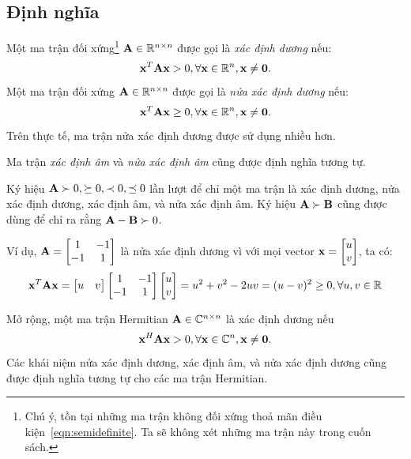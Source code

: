 \subsection{Định nghĩa} %
\label{sub:dinh_nghia}
Một ma trận đối xứng\footnote{Chú ý, tồn tại những ma trận không đối xứng thoả
mãn điều kiện~\eqref{eqn:semidefinite}. Ta sẽ không xét những ma trận này trong cuốn sách.}
$\mathbf{A} \in \mathbb{R}^{n\times n}$ được gọi là \textit{xác định dương} nếu:
\begin{equation}
\label{eqn:semidefinite}
\mathbf{x}^T\mathbf{A}\mathbf{x} > 0, \forall \mathbf{x} \in \mathbb{R}^{n}, \mathbf{x} \neq \mathbf{0}.
\end{equation}
Một ma trận đối xứng $\mathbf{A} \in \mathbb{R}^{n \times n}$ được gọi là \textit{nửa xác định
dương} nếu:
\begin{equation}
\mathbf{x}^T\mathbf{A}\mathbf{x} \geq 0, \forall \mathbf{x} \in \mathbb{R}^{n}, \mathbf{x} \neq \mathbf{0}.
\end{equation}
Trên thực tế, ma trận nửa xác định dương được sử dụng nhiều hơn.


Ma trận \textit{xác định âm} và \textit{nửa xác định âm}  cũng được định nghĩa
tương tự.

Ký hiệu $\mathbf{A} \succ 0, \succeq 0, \prec 0, \preceq 0$ lần lượt để chỉ một ma trận
là xác định dương, nửa xác định dương, xác định âm, và nửa xác định âm. Ký hiệu
$\mathbf{A} \succ \mathbf{B}$ cũng được dùng để chỉ ra rằng $\mathbf{A} - \mathbf{B}
\succ 0$.

Ví dụ, $\mathbf{A} = \left[\begin{matrix} 1 & -1 \\ -1 & 1\end{matrix}\right]$ là nửa xác định dương vì với mọi vector
$\mathbf{x} = \left[\begin{matrix} u \\ v \end{matrix}\right]$, ta có:
\begin{equation}
\mathbf{x}^T \mathbf{A}\mathbf{x} = \left[\begin{matrix} u & v \end{matrix}\right] \left[\begin{matrix} 1 & -1 \\ -1 & 1\end{matrix}\right] \left[\begin{matrix} u \\ v \end{matrix}\right] =
u^2 + v^2 - 2uv = (u - v)^2 \geq 0, \forall u, v \in \mathbb{R}
\end{equation}

Mở rộng, một ma trận Hermitian $\mathbf{A} \in \mathbb{C}^{n\times n}$ là xác định dương nếu
\begin{equation}
\mathbf{x}^H\mathbf{A}\mathbf{x} > 0, \forall \mathbf{x} \in \mathbb{C}^{n}, \mathbf{x} \neq \mathbf{0}.
\end{equation}
Các khái niệm nửa xác định dương, xác định âm, và nửa xác định dương cũng được
định nghĩa tương tự cho các ma trận Hermitian.
